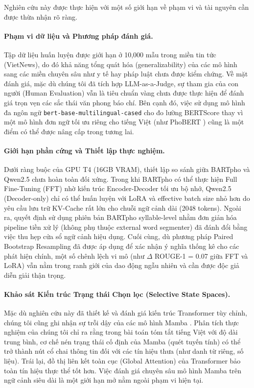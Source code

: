 \documentclass{article}
\begin{document}
Nghiên cứu này được thực hiện với một số giới hạn về phạm vi và tài nguyên cần được thừa nhận rõ ràng. 

\paragraph{Phạm vi dữ liệu và Phương pháp đánh giá.} 
Tập dữ liệu huấn luyện được giới hạn ở 10,000 mẫu trong miền tin tức (VietNews), do đó khả năng tổng quát hóa (generalizability) của các mô hình sang các miền chuyên sâu như y tế hay pháp luật chưa được kiểm chứng. Về mặt đánh giá, mặc dù chúng tôi đã tích hợp LLM-as-a-Judge, sự tham gia của con người (Human Evaluation) vẫn là tiêu chuẩn vàng chưa được thực hiện để đánh giá trọn vẹn các sắc thái văn phong báo chí. Bên cạnh đó, việc sử dụng mô hình đa ngôn ngữ \texttt{bert-base-multilingual-cased} cho đo lường BERTScore thay vì một mô hình đơn ngữ tối ưu riêng cho tiếng Việt (như PhoBERT \cite{phobert}) cũng là một điểm có thể được nâng cấp trong tương lai.

\paragraph{Giới hạn phần cứng và Thiết lập thực nghiệm.} 
Dưới ràng buộc của GPU T4 (16GB VRAM), thiết lập so sánh giữa BARTpho và Qwen2.5 chưa hoàn toàn đối xứng. Trong khi BARTpho có thể thực hiện Full Fine-Tuning (FFT) nhờ kiến trúc Encoder-Decoder tối ưu bộ nhớ, Qwen2.5 (Decoder-only) chỉ có thể huấn luyện với LoRA và effective batch size nhỏ hơn do yêu cầu lưu trữ KV-Cache rất lớn cho chuỗi ngữ cảnh dài (2048 tokens). Ngoài ra, quyết định sử dụng phiên bản BARTpho syllable-level nhằm đơn giản hóa pipeline tiền xử lý (không phụ thuộc external word segmenter) đã đánh đổi bằng việc thu hẹp cửa sổ ngữ cảnh hiệu dụng. Cuối cùng, dù phương pháp Paired Bootstrap Resampling đã được áp dụng để xác nhận ý nghĩa thống kê cho các phát hiện chính, một số chênh lệch vi mô (như $\Delta$ ROUGE-1 = 0.07 giữa FFT và LoRA) vẫn nằm trong ranh giới của dao động ngẫu nhiên và cần được độc giả diễn giải thận trọng.

\paragraph{Khảo sát Kiến trúc Trạng thái Chọn lọc (Selective State Spaces).}
Mặc dù nghiên cứu này đã thiết kế và đánh giá kiến trúc Transformer tùy chỉnh, chúng tôi cũng ghi nhận sự trỗi dậy của các mô hình Mamba \cite{mamba_custom}. Phân tích thực nghiệm của chúng tôi chỉ ra rằng trong bài toán tóm tắt tiếng Việt với độ dài trung bình, cơ chế nén trạng thái cố định của Mamba (quét tuyến tính) có thể trở thành nút cổ chai thông tin đối với các tín hiệu thưa (như danh từ riêng, số liệu). Trái lại, đồ thị liên kết toàn cục (Global Attention) của Transformer bảo toàn tín hiệu thực thể tốt hơn. Việc đánh giá chuyên sâu mô hình Mamba trên ngữ cảnh siêu dài là một giới hạn mở nằm ngoài phạm vi hiện tại.
\end{document}
